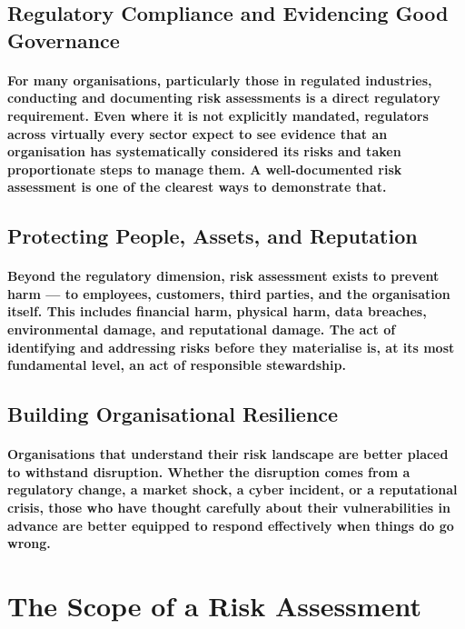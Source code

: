 \subsection{Regulatory Compliance and Evidencing Good Governance}
\paragraph{For many organisations, particularly those in regulated industries, conducting and documenting risk assessments is a direct regulatory requirement. Even where it is not explicitly mandated, regulators across virtually every sector expect to see evidence that an organisation has systematically considered its risks and taken proportionate steps to manage them. A well-documented risk assessment is one of the clearest ways to demonstrate that.}

\subsection{Protecting People, Assets, and Reputation}
\paragraph{Beyond the regulatory dimension, risk assessment exists to prevent harm — to employees, customers, third parties, and the organisation itself. This includes financial harm, physical harm, data breaches, environmental damage, and reputational damage. The act of identifying and addressing risks before they materialise is, at its most fundamental level, an act of responsible stewardship.}

\subsection{Building Organisational Resilience}
\paragraph{Organisations that understand their risk landscape are better placed to withstand disruption. Whether the disruption comes from a regulatory change, a market shock, a cyber incident, or a reputational crisis, those who have thought carefully about their vulnerabilities in advance are better equipped to respond effectively when things do go wrong.}


\section{The Scope of a Risk Assessment}

